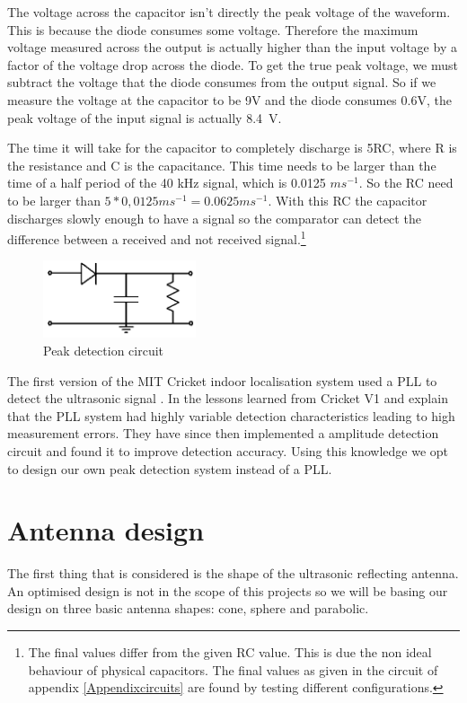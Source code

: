The voltage across the capacitor isn't directly the peak voltage of the waveform.
This is because the diode consumes some voltage.
Therefore the maximum voltage measured across the output is actually higher than the input voltage by a factor of the voltage drop across the diode.
To get the true peak voltage, we must subtract the voltage that the diode consumes from the output signal.
So if we measure the voltage at the capacitor to be 9V and the diode consumes 0.6V, the peak voltage of the input signal is actually \SI{8.4}{\volt}.

The time it will take for the capacitor to completely discharge is 5RC, where R is the resistance and C is the capacitance.
This time needs to be larger than the time of a half period of the 40 kHz signal, which is 0.0125 $ms^{-1}$.
So the RC need to be larger than $5 * 0,0125 ms^{-1} = 0.0625ms^{-1}$.
With this RC the capacitor discharges slowly enough to have a signal so the comparator can detect the difference between a received and not received signal.\footnote{The final values differ from the given RC value. This is due the non ideal behaviour of physical capacitors. The final values as given in the circuit of appendix \ref{Appendixcircuits} are found by testing different configurations.}

\begin{figure}[H]
\centering
\includegraphics[width=0.4\textwidth]{Figures/peak_d.PNG}
\caption{Peak detection circuit}
\label{fig:peak_d}
\end{figure}

The first version of the MIT Cricket indoor localisation system used a PLL to detect the ultrasonic signal \cite{Priyantha2000}.
In \cite{Balakrishnan2003} the lessons learned from Cricket V1 and explain that the PLL system had highly variable detection characteristics leading to high measurement errors.
They have since then implemented a amplitude detection circuit and found it to improve detection accuracy.
Using this knowledge we opt to design our own peak detection system instead of a PLL.

\section{Antenna design}
The first thing that is considered is the shape of the ultrasonic reflecting antenna. An optimised design is not in the scope of this projects so we will be basing our design on three basic antenna shapes: cone, sphere and parabolic.


